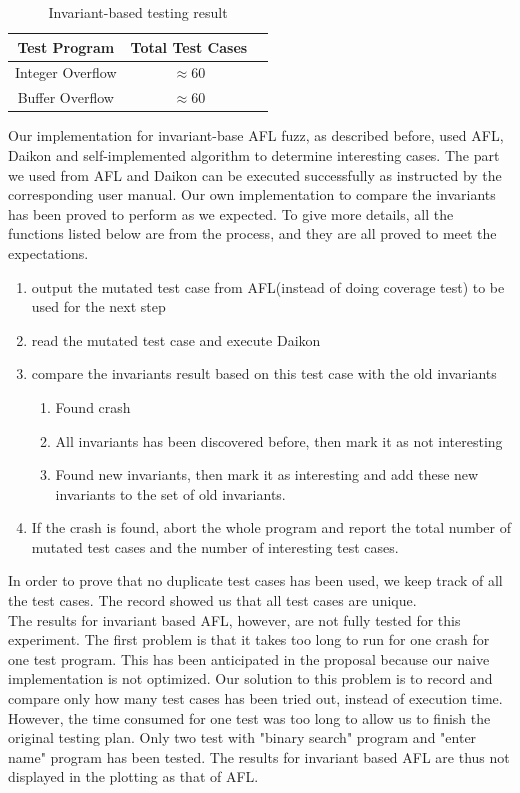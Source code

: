\documentclass[sigplan,10pt,review = false]{acmart}\settopmatter{printfolios=true,printccs=false,printacmref=false}
\begin{document}
\begin{table}[h!]
\caption{Invariant-based testing result}
\begin{center}
\begin{tabular}{ |c||c|c| } 
\hline
Test Program & Total Test Cases\\
  \hline
  Integer Overflow & $\approx 60$\\ 
  \hline
  Buffer Overflow & $\approx 60$\\ 
  
  \hline
\end{tabular}
\end{center}
\end{table}
Our implementation for invariant-base AFL fuzz, as described before, used AFL, Daikon and self-implemented algorithm to determine interesting cases. The part we used from AFL and Daikon can be executed successfully as instructed by the corresponding user manual. Our own implementation to compare the invariants has been proved to perform as we expected. To give more details, all the functions listed below are from the process, and they are all proved to meet the expectations. \begin{enumerate}
\item output the mutated test case from AFL(instead of doing coverage test) to be used for the next step
\item read the mutated test case and execute Daikon 
\item compare the invariants result based on this test case with the old invariants
\begin{enumerate}
\item Found crash
\item All invariants has been discovered before, then mark it as not interesting
\item Found new invariants, then mark it as interesting and add these new invariants to the set of old invariants.
\end{enumerate}
\item If the crash is found, abort the whole program and report the total number of mutated test cases and the number of interesting test cases.
\end{enumerate}
In order to prove that no duplicate test cases has been used, we keep track of all the test cases. The record showed us that all test cases are unique.\\
The results for invariant based AFL, however, are not fully tested for this experiment. The first problem is that it takes too long to run for one crash for one test program. This has been anticipated in the proposal because our naive implementation is not optimized. Our solution to this problem is to record and compare only how many test cases has been tried out, instead of execution time. However, the time consumed for one test was too long to allow us to finish the original testing plan. Only two test with "binary search" program and "enter name" program has been tested. The results for invariant based AFL are thus not displayed in the plotting as that of AFL.\\ 
\end{document}
